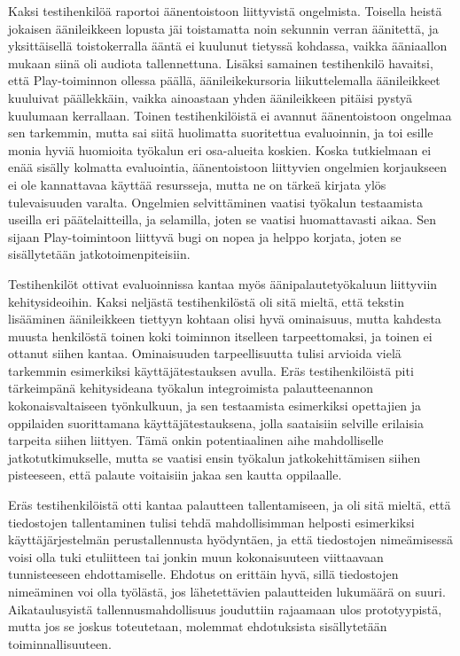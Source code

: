 \documentclass[utf8]{gradu3}
\begin{document}
Kaksi testihenkilöä raportoi äänentoistoon liittyvistä ongelmista. Toisella heistä jokaisen äänileikkeen lopusta jäi toistamatta noin sekunnin verran äänitettä, ja yksittäisellä toistokerralla ääntä ei kuulunut tietyssä kohdassa, vaikka ääniaallon mukaan siinä oli audiota tallennettuna. Lisäksi samainen testihenkilö havaitsi, että Play-toiminnon ollessa päällä, äänileikekursoria liikuttelemalla äänileikkeet kuuluivat päällekkäin, vaikka ainoastaan yhden äänileikkeen pitäisi pystyä kuulumaan kerrallaan. Toinen testihenkilöistä ei avannut äänentoistoon ongelmaa sen tarkemmin, mutta sai siitä huolimatta suoritettua evaluoinnin, ja toi esille monia hyviä huomioita työkalun eri osa-alueita koskien. Koska tutkielmaan ei enää sisälly kolmatta evaluointia, äänentoistoon liittyvien ongelmien korjaukseen ei ole kannattavaa käyttää resursseja, mutta ne on tärkeä kirjata ylös tulevaisuuden varalta. Ongelmien selvittäminen vaatisi työkalun testaamista useilla eri päätelaitteilla, ja selamilla, joten se vaatisi huomattavasti aikaa. Sen sijaan Play-toimintoon liittyvä bugi on nopea ja helppo korjata, joten se sisällytetään jatkotoimenpiteisiin.

Testihenkilöt ottivat evaluoinnissa kantaa myös äänipalautetyökaluun liittyviin kehitysideoihin. Kaksi neljästä testihenkilöstä oli sitä mieltä, että tekstin lisääminen äänileikkeen tiettyyn kohtaan olisi hyvä ominaisuus, mutta kahdesta muusta henkilöstä toinen koki toiminnon itselleen tarpeettomaksi, ja toinen ei ottanut siihen kantaa. Ominaisuuden tarpeellisuutta tulisi arvioida vielä tarkemmin esimerkiksi käyttäjätestauksen avulla. Eräs testihenkilöistä piti tärkeimpänä kehitysideana työkalun integroimista palautteenannon kokonaisvaltaiseen työnkulkuun, ja sen testaamista esimerkiksi opettajien ja oppilaiden suorittamana käyttäjätestauksena, jolla saataisiin selville erilaisia tarpeita siihen liittyen. Tämä onkin potentiaalinen aihe mahdolliselle jatkotutkimukselle, mutta se vaatisi ensin työkalun jatkokehittämisen siihen pisteeseen, että palaute voitaisiin jakaa sen kautta oppilaalle.

Eräs testihenkilöistä otti kantaa palautteen tallentamiseen, ja oli sitä mieltä, että tiedostojen tallentaminen tulisi tehdä mahdollisimman helposti esimerkiksi käyttäjärjestelmän perustallennusta hyödyntäen, ja että tiedostojen nimeämisessä voisi olla tuki etuliitteen tai jonkin muun kokonaisuuteen viittaavaan tunnisteeseen ehdottamiselle. Ehdotus on erittäin hyvä, sillä tiedostojen nimeäminen voi olla työlästä, jos lähetettävien palautteiden lukumäärä on suuri. Aikataulusyistä tallennusmahdollisuus jouduttiin rajaamaan ulos prototyypistä, mutta jos se joskus toteutetaan, molemmat ehdotuksista sisällytetään toiminnallisuuteen.
\end{document}
